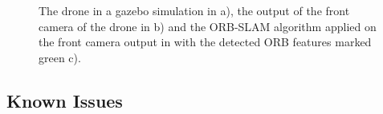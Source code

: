 	\begin{figure}%
    \centering
    \qquad
	\qquad
    \caption{
	The drone in a gazebo simulation in a), the output of the front camera of the drone in b) and
	the ORB-SLAM algorithm applied on the front camera output in with the detected ORB features marked green c).
	}%
    \label{fig:simfigs}%
	\end{figure}

	\subsection{Known Issues} \label{frameissues}
	
